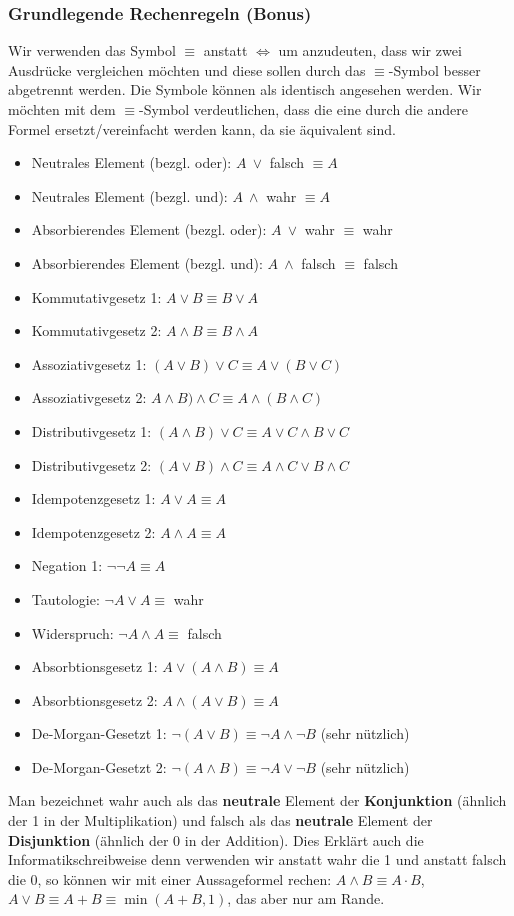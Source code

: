 \subsubsection{Grundlegende Rechenregeln (Bonus)}
Wir verwenden das Symbol $\equiv$ anstatt $\iff$ um anzudeuten, dass wir zwei Ausdrücke vergleichen möchten und diese sollen durch das $\equiv$-Symbol besser abgetrennt werden. Die Symbole können als identisch angesehen werden. Wir möchten mit dem $\equiv$-Symbol verdeutlichen, dass die eine durch die andere Formel ersetzt/vereinfacht werden kann, da sie äquivalent sind.
\begin{itemize}
\item Neutrales Element (bezgl. oder): $A \ \lor $ falsch $\equiv A$
\item Neutrales Element (bezgl. und): $A \ \land $ wahr $\equiv A$
\item Absorbierendes Element (bezgl. oder): $A \ \lor $ wahr $\equiv$ wahr
\item Absorbierendes Element (bezgl. und): $A \ \land $ falsch $\equiv$ falsch
\item Kommutativgesetz 1: $A \lor B \equiv B \lor A$
\item Kommutativgesetz 2: $A \land B \equiv B \land A$
\item Assoziativgesetz 1: $(A \lor B) \lor C \equiv A \lor (B \lor C)$
\item Assoziativgesetz 2: $A \land B) \land C \equiv A \land (B \land C)$
\item Distributivgesetz 1: $(A \land B) \lor C \equiv A \lor C \land  B \lor C$
\item Distributivgesetz 2: $(A \lor B) \land C \equiv A \land C \lor B \land C$
\item Idempotenzgesetz 1: $A \lor A \equiv A$
\item Idempotenzgesetz 2: $A \land A \equiv A$
\item Negation 1: $\neg \neg A \equiv A$
\item Tautologie: $\neg A \lor A \equiv $ wahr
\item Widerspruch: $\neg A \land A \equiv$ falsch
\item Absorbtionsgesetz 1: $A \lor (A \land B) \equiv A$
\item Absorbtionsgesetz 2: $A \land (A \lor B) \equiv A$
\item De-Morgan-Gesetzt 1: $\neg (A \lor B) \equiv \neg A \land \neg B$ (sehr nützlich)
\item De-Morgan-Gesetzt 2: $\neg (A \land B) \equiv \neg A \lor \neg B$ (sehr nützlich)
\end{itemize}
Man bezeichnet wahr auch als das \textbf{neutrale} Element der \textbf{Konjunktion} (ähnlich der 1 in der Multiplikation) und falsch als das \textbf{neutrale} Element der \textbf{Disjunktion} (ähnlich der 0 in der Addition). Dies Erklärt auch die Informatikschreibweise denn verwenden wir anstatt wahr die 1 und anstatt falsch die 0, so können wir mit einer Aussageformel rechen: $A \land B \equiv A \cdot B$, $A \lor B \equiv A + B \equiv \min(A + B, 1)$, das aber nur am Rande.

